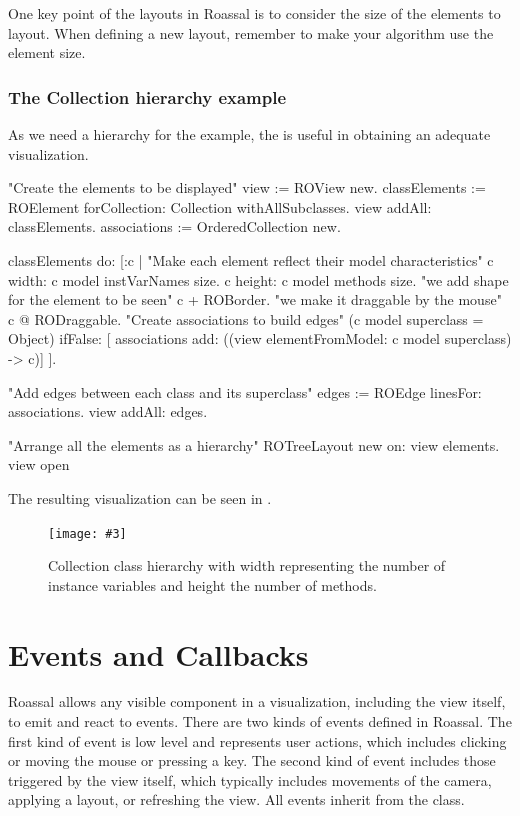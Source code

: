 \documentclass[a4paper,10pt,twoside]{book}
\newcommand{\fig}[4]{
		\begin{figure}[#1]
			\centering
			\texttt{[image: \#3]}
			\caption{\label{fig:#3}#4}
		\end{figure}}
\begin{document}
One key point of the layouts in Roassal is to consider the size of the elements to layout. When defining a new layout, remember to make your algorithm use the element size.

\subsubsection{The Collection hierarchy example}

As we need a hierarchy for the  example, the  is useful in obtaining an adequate visualization.

\begin{code}{}
"Create the elements to be displayed"
view := ROView new.
classElements := ROElement forCollection: Collection withAllSubclasses.
view addAll: classElements.
associations := OrderedCollection new.
\end{code}

\begin{code}{}
classElements do: [:c | 
	"Make each element reflect their model characteristics"
	c width: c model instVarNames size.
	c height: c model methods size.
	"we add shape for the element to be seen"
	c + ROBorder. 
	"we make it draggable by the mouse"
	c @ RODraggable.
	"Create associations to build edges"
	(c model superclass = Object)
		ifFalse: [ associations add: ((view elementFromModel: c model superclass) -> c)]	
	 ].
\end{code}

\begin{code}{}	 
"Add edges between each class and its superclass"
edges := ROEdge linesFor: associations.
view addAll: edges.

"Arrange all the elements as a hierarchy"
ROTreeLayout new on: view elements.
view open
\end{code}


The resulting visualization can be seen in .

\fig{H}{0.4}{collectionHierarchy}{Collection class hierarchy with width representing the number of instance variables and height the number of methods.}


\section{Events and Callbacks}

Roassal allows any visible component in a visualization, including the view itself, to emit and react to events. There are two kinds of events defined in Roassal. The first kind of event is low level and represents user actions, which includes clicking or moving the mouse or pressing a key. The second kind of event includes those triggered by the view itself, which typically includes movements of the camera, applying a layout, or refreshing the view. All events inherit from the  class.
\end{document}
